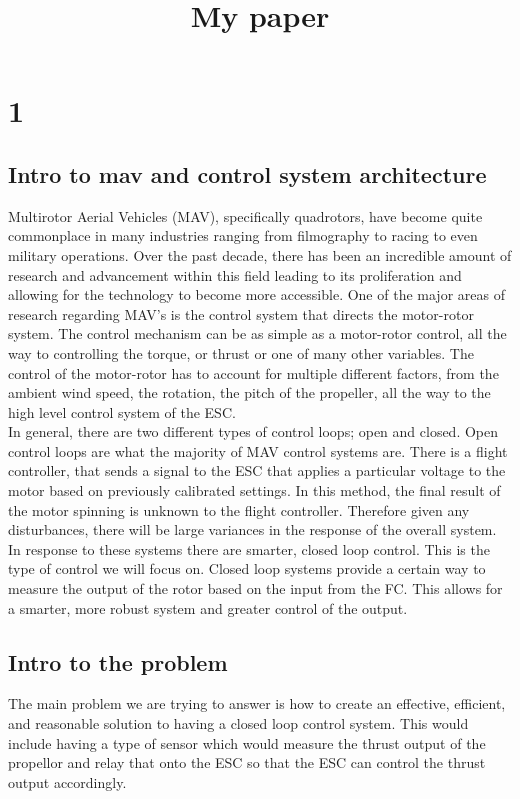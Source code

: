 \documentclass[twocolumn]{article}
\begin{document}
	\title{\begin{titlepage}
			My paper
	\end{titlepage}}
	\section{1}
	\subsection{Intro to mav and control system architecture}
	Multirotor Aerial Vehicles (MAV), specifically quadrotors, have become quite commonplace in many industries ranging from filmography to racing to even military operations. Over the past decade, there has been an incredible amount of research and advancement within this field leading to its proliferation and allowing for the technology to become more accessible. One of the major areas of research regarding MAV's is the control system that directs the motor-rotor system. The control mechanism can be as simple as a motor-rotor control, all the way to controlling the torque, or thrust or one of many other variables. The control of the motor-rotor has to account for multiple different factors, from the ambient wind speed, the rotation, the pitch of the propeller, all the way to the high level control system of the ESC. \\
	In general, there are two different types of control loops; open and closed. Open control loops are what the majority of MAV control systems are. There is a flight controller, that sends a signal to the ESC that applies a particular voltage to the motor based on previously calibrated settings. In this method, the final result of the motor spinning is unknown to the flight controller. Therefore given any disturbances, there will be large variances in the response of the overall system. In response to these systems there are smarter, closed loop control. This is the type of control we will focus on. Closed loop systems provide a certain way to measure the output of the rotor based on the input from the FC. This allows for a smarter, more robust system and greater control of the output. \\
	\subsection{Intro to the problem}
	The main problem we are trying to answer is how to create an effective, efficient, and reasonable solution to having a closed loop control system. This would include having a type of sensor which would measure the thrust output of the propellor and relay that onto the ESC so that the ESC can control the thrust output accordingly.
\end{document}
